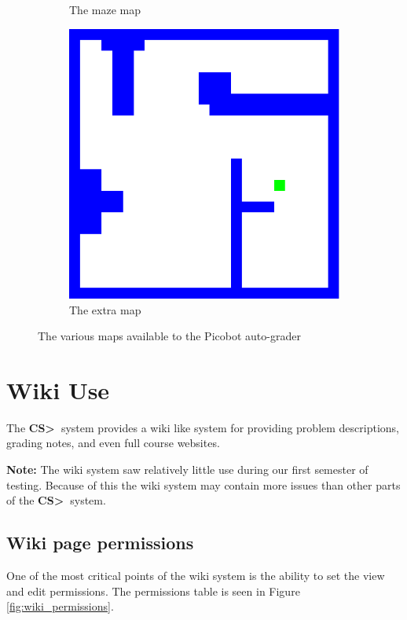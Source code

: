 \documentclass[11pt]{report}
\newcommand{\csgt}[0]{\textbf{CS\textgreater\ }}
\begin{document}
\begin{figure}
\begin{subfigure}[b]{0.3\textwidth}
		\caption{The maze map}
		\label{fig:maze_map}
	\end{subfigure}
	\begin{subfigure}[b]{0.3\textwidth}
		\includegraphics[width=\textwidth]{diagrams/extraMap}
		\caption{The extra map}
		\label{fig:extra_map}
	\end{subfigure}
	\caption{The various maps available to the Picobot auto-grader}
	\label{fig:maps}
\end{figure}

\pagebreak
\section{Wiki Use}
\label{sec:wiki}
The \csgt system provides a wiki like system for providing problem descriptions, grading notes, and
even full course websites. 

\noindent\textbf{Note:} The wiki system saw relatively little use during our first semester of testing. 
Because of this the wiki system may contain more issues than other parts of the \csgt system.

\subsection{Wiki page permissions}
One of the most critical points of the wiki system is the ability to set the view and edit permissions.
The permissions table is seen in Figure \ref{fig:wiki_permissions}.
\end{document}
